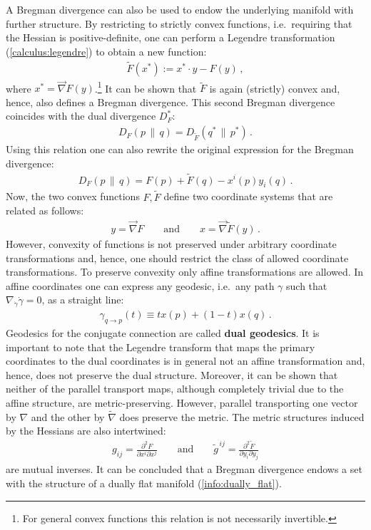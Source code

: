     A Bregman divergence can also be used to endow the underlying manifold with further structure. By restricting to strictly convex functions, i.e.~requiring that the Hessian is positive-definite, one can perform a Legendre transformation (\cref{calculus:legendre}) to obtain a new function:
    \begin{gather}
        \label{info:legendre}
        \widetilde{F}(x^*) := x^*\cdot y - F(y)\,,
    \end{gather}
    where $x^*=\vec{\nabla}F(y)$.\footnote{For general convex functions this relation is not necessarily invertible.} It can be shown that $\widetilde{F}$ is again (strictly) convex and, hence, also defines a Bregman divergence. This second Bregman divergence coincides with the dual divergence $D_F^*$:
    \begin{gather}
        D_F(p\,\|\,q) = D_{\widetilde{F}}(q^*\,\|\,p^*)\,.
    \end{gather}
    Using this relation one can also rewrite the original expression for the Bregman divergence:
    \begin{gather}
        D_F(p\,\|\,q) = F(p) + \widetilde{F}(q) - x^i(p)y_i(q)\,.
    \end{gather}
    Now, the two convex functions $F,\widetilde{F}$ define two coordinate systems that are related as follows:
    \begin{gather}
        y=\vec{\nabla}F\qquad\text{and}\qquad x=\vec{\nabla}\widetilde{F}(y)\,.
    \end{gather}
    However, convexity of functions is not preserved under arbitrary coordinate transformations and, hence, one should restrict the class of allowed coordinate transformations. To preserve convexity only affine transformations are allowed. In affine coordinates one can express any geodesic, i.e.~any path $\gamma$ such that $\nabla_{\dot{\gamma}}\dot{\gamma}=0$, as a straight line:
    \begin{gather}
        \gamma_{q\rightarrow p}(t) \equiv tx(p) + (1-t)x(q)\,.
    \end{gather}
    Geodesics for the conjugate connection are called \textbf{dual geodesics}. It is important to note that the Legendre transform that maps the primary coordinates to the dual coordinates is in general not an affine transformation and, hence, does not preserve the dual structure. Moreover, it can be shown that neither of the parallel transport maps, although completely trivial due to the affine structure, are metric-preserving. However, parallel transporting one vector by $\nabla$ and the other by $\widetilde{\nabla}$ does preserve the metric. The metric structures induced by the Hessians are also intertwined:
    \begin{gather}
        \label{info:bregman_metric}
        g_{ij} = \frac{\partial^2F}{\partial x^i\partial x^j}\qquad\text{and}\qquad \widetilde{g}^{\,ij} = \frac{\partial^2\widetilde{F}}{\partial y_i\partial y_j}
    \end{gather}
    are mutual inverses. It can be concluded that a Bregman divergence endows a set with the structure of a dually flat manifold (\cref{info:dually_flat}).

